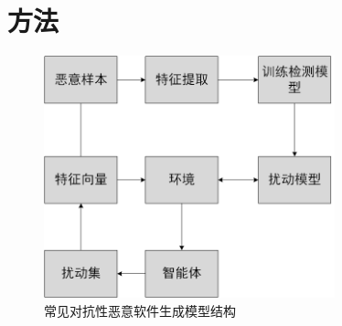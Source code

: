 \chapter{方法}





\begin{figure}[hbt]
	\centering
	\includegraphics[width=0.75\textwidth]{figures/3.1}
	\caption{常见对抗性恶意软件生成模型结构}\label{fig:3.1}
\end{figure}

